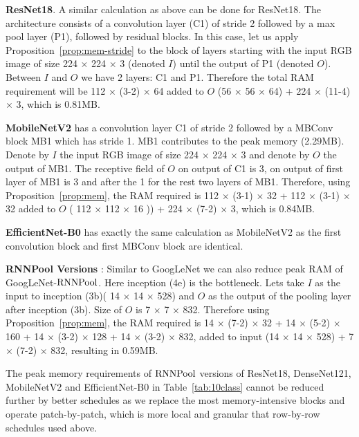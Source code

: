 \documentclass[10pt]{article}
\newcommand{\rpool}{\ensuremath{{\rm RNNPool}}\xspace}
\begin{document}
\textbf{ResNet18}. A similar calculation as above can be done for
ResNet18. The architecture consists of a convolution layer (C1) of
stride 2 followed by a max pool layer (P1), followed by residual
blocks. In this case, let us apply Proposition~\ref{prop:mem-stride}
to the block of layers starting with the input RGB image of size 224
$\times$ 224 $\times$ 3 (denoted $I$) until the output of P1 (denoted
$O$). Between $I$ and $O$ we have 2 layers: C1 and P1. Therefore the
total RAM requirement will be 112 $\times$ (3-2) $\times$ 64 added to
$O$ (56 $\times$ 56 $\times$ 64) + 224 $\times$ (11-4) $\times$ 3,
which is 0.81MB.




\textbf{MobileNetV2} has a convolution layer C1 of stride 2 followed
by a MBConv block MB1 which has stride 1. MB1 contributes to the peak
memory (2.29MB). Denote by $I$ the input RGB image of size 224
$\times$ 224 $\times$ 3 and denote by $O$ the output of MB1. The
receptive field of $O$ on output of C1 is 3, on output of first layer
of MB1 is 3 and after the 1 for the rest two layers of MB1. Therefore,
using Proposition~\ref{prop:mem}, the RAM required is 112 $\times$
(3-1) $\times$ 32 + 112 $\times$ (3-1) $\times$ 32 added to $O$ ( 112
$\times$ 112 $\times$ 16 )) + 224 $\times$ (7-2) $\times$ 3, which is
0.84MB.

\textbf{EfficientNet-B0} has exactly the same calculation as
MobileNetV2 as the first convolution block and first MBConv block are
identical.


\textbf{RNNPool Versions} : Similar to GoogLeNet we can also reduce
peak RAM of GoogLeNet-\rpool. Here inception (4e) is the bottleneck.
Lets take $I$ as the input to inception (3b)( 14 $\times$ 14 $\times$
528) and $O$ as the output of the pooling layer after inception
(3b). Size of $O$ is 7 $\times$ 7 $\times$ 832. Therefore using
Proposition~\ref{prop:mem}, the RAM required is 14 $\times$ (7-2)
$\times$ 32 + 14 $\times$ (5-2) $\times$ 160 + 14 $\times$ (3-2)
$\times$ 128 + 14 $\times$ (3-2) $\times$ 832, added to input (14
$\times$ 14 $\times$ 528) + 7 $\times$ (7-2) $\times$ 832, resulting
in 0.59MB.

The peak memory requirements of \rpool versions of ResNet18,
DenseNet121, MobileNetV2 and EfficientNet-B0 in
Table~\ref{tab:10class} cannot be reduced further by better schedules
as we replace the most memory-intensive blocks and operate
patch-by-patch, which is more local and granular that row-by-row
schedules used above.
\end{document}
